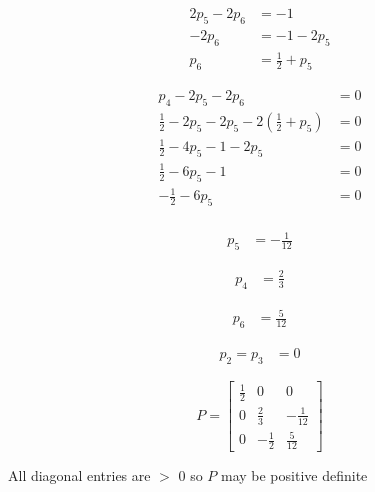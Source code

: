 \documentclass{article}
\begin{document}
\begin{enumerate}[label=\alph*)]
\begin{enumerate}[label=\roman*)]
        \begin{align*}
            2p_5 - 2p_6 &= -1 \\
            -2p_6 &= -1 - 2p_5 \\
            p_6 &= \frac{1}{2} + p_5
        \end{align*}

        \begin{align*}
            p_4 - 2p_5 - 2p_6 &= 0 \\
            \frac{1}{2} - 2p_5 - 2p_5 - 2\left(\frac{1}{2} + p_5\right) &= 0 \\
            \frac{1}{2} - 4p_5 - 1 - 2p_5 &= 0 \\
            \frac{1}{2} -6p_5 - 1 &= 0 \\
            -\frac{1}{2} - 6p_5 &= 0 \\
        \end{align*}

        \begin{align*}
            p_5 &= \boxed{-\frac{1}{12}}
        \end{align*}

        \begin{align*}
            p_4 &= \boxed{\frac{2}{3}}
        \end{align*}

        \begin{align*}
            p_6 &= \boxed{\frac{5}{12}}
        \end{align*}

        \begin{align*}
            p_2 = p_3 &= \boxed{0}
        \end{align*}

        \[
        P = 
        \begin{bmatrix}
            \frac{1}{2} & 0 & 0 \\
            0 & \frac{2}{3} & -\frac{1}{12} \\
            0 & -\frac{1}{2} & \frac{5}{12}
        \end{bmatrix}
        \]

        All diagonal entries are $>$ 0 so $P$ may be positive definite


\end{enumerate}
\end{enumerate}
\end{document}
